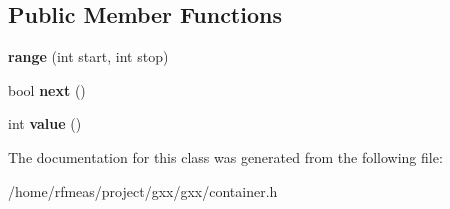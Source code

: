 \subsection*{Public Member Functions}
\begin{DoxyCompactItemize}
\item 
{\bfseries range} (int start, int stop)\hypertarget{classgxx_1_1gen_1_1range_af6cc3e2038eb5c9abee7be91d8a17662}{}\label{classgxx_1_1gen_1_1range_af6cc3e2038eb5c9abee7be91d8a17662}

\item 
bool {\bfseries next} ()\hypertarget{classgxx_1_1gen_1_1range_a390dd3f28104ce403710d0503454e91c}{}\label{classgxx_1_1gen_1_1range_a390dd3f28104ce403710d0503454e91c}

\item 
int {\bfseries value} ()\hypertarget{classgxx_1_1gen_1_1range_a69318003e65cc6aed9b9b6aa0243fdd2}{}\label{classgxx_1_1gen_1_1range_a69318003e65cc6aed9b9b6aa0243fdd2}

\end{DoxyCompactItemize}


The documentation for this class was generated from the following file\+:\begin{DoxyCompactItemize}
\item 
/home/rfmeas/project/gxx/gxx/container.\+h\end{DoxyCompactItemize}

